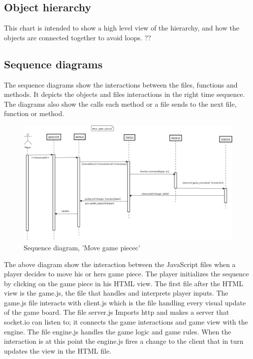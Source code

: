 \subsection{Object hierarchy}
This chart is intended to show a high level view of the hierarchy, and how the objects are connected together to avoid loops. 
??
\subsection{Sequence diagrams}

The sequence diagrams show the interactions between the files, functions and methods. It depicts the objects and files interactions in the right time sequence. The diagrams also show the calls each method or a file sends to the next file, function or method.  \\


\begin{figure}[H]
  \centering
    \includegraphics[width=1.0\textwidth]{img/movegamepiececsekvensdiagram.jpeg}
  \caption{Sequence diagram, 'Move game piecec'} 
  \label{fig:movegamepieceseq}
\end{figure}

The above diagram show the interaction between the JavaScript  files when a player decides to move his or hers game piece. The player initializes the sequence by clicking on the game piece in his HTML view. The first file after the HTML view is the game.js, the file that handles and interprets player inputs. The game.js file interacts with client.js which is the file handling every visual update of the game board. The file server.js Imports http and makes a server that socket.io can listen to; it connects the game interactions and game view with the engine. The file engine.js handles the game logic and game rules. When the interaction is at this point the engine.js fires a change to the client that in turn updates the view in the HTML file.\\


